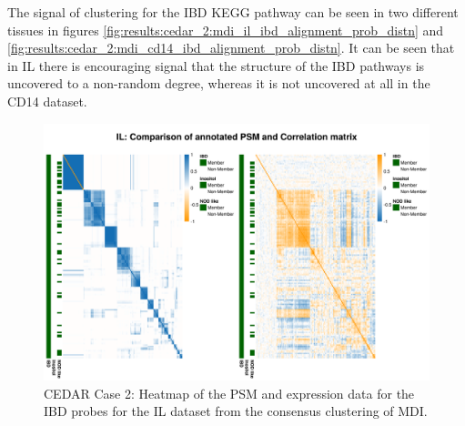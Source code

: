 \documentclass[14pt]{extarticle} %
\begin{document}

	The signal of clustering for the IBD KEGG pathway can be seen in two different tissues in figures \ref{fig:results:cedar_2:mdi_il_ibd_alignment_prob_distn} and \ref{fig:results:cedar_2:mdi_cd14_ibd_alignment_prob_distn}. It can be seen that in IL there is encouraging signal that the structure of the IBD pathways is uncovered to a non-random degree, whereas it is not uncovered at all in the CD14 dataset.
%	
	
	\begin{figure}
		\centering
		\includegraphics[scale=0.75]{Images/Biology_data/Set_1000/All_datasets/Heatmaps/KEGG_INFLAMMATORY_BOWEL_DISEASE/IL_comp_psm_corr.png}
		\caption{CEDAR Case 2: Heatmap of the PSM and expression data for the IBD probes for the IL dataset from the consensus clustering of MDI.}
		\label{fig:results:cedar_2:mdi_il_ibd_psm_cor}
	\end{figure}
	
\end{document}
